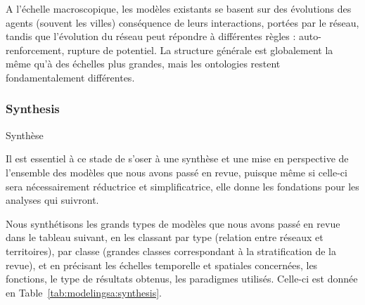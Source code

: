 A l'échelle macroscopique, les modèles existants se basent sur des évolutions des agents (souvent les villes) conséquence de leurs interactions, portées par le réseau, tandis que l'évolution du réseau peut répondre à différentes règles : auto-renforcement, rupture de potentiel. La structure générale est globalement la même qu'à des échelles plus grandes, mais les ontologies restent fondamentalement différentes.





\subsubsection*{Synthesis}{Synthèse}


Il est essentiel à ce stade de s'oser à une synthèse et une mise en perspective de l'ensemble des modèles que nous avons passé en revue, puisque même si celle-ci sera nécessairement réductrice et simplificatrice, elle donne les fondations pour les analyses qui suivront.




Nous synthétisons les grands types de modèles que nous avons passé en revue dans le tableau suivant, en les classant par type (relation entre réseaux et territoires), par classe (grandes classes correspondant à la stratification de la revue), et en précisant les échelles temporelle et spatiales concernées, les fonctions, le type de résultats obtenus, les paradigmes utilisés. Celle-ci est donnée en Table~\ref{tab:modelingsa:synthesis}.

